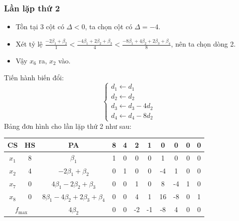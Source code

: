 \documentclass[12pt]{article}
\begin{document}
\subsubsection{Lần lặp thứ 2}
\begin{itemize}
\item Tồn tại 3 cột có $\Delta < 0$, ta chọn cột có $\Delta = -4$.
\item Xét tỷ lệ $\displaystyle \frac{-2\beta_1 + \beta_2}{1} < \frac{-4\beta_1 + 2\beta_2 + \beta_3}{4} < \frac{-8\beta_1 + 4\beta_2 + 2\beta_3 + \beta_4}{8}$, nên ta chọn dòng 2.
\item Vậy $x_6$ ra, $x_2$ vào.
\end{itemize}
Tiến hành biến đổi:
$$
\left\{
\begin{array}{lll}
d_1 \leftarrow d_1 \\
d_2 \leftarrow d_2 \\
d_3 \leftarrow d_3 - 4d_2 \\
d_4 \leftarrow d_4 - 8d_2
\end{array}
\right.
$$
Bảng đơn hình cho lần lặp thứ 2 như sau:
\begin{table}[H]
\centering
\begin{tabular}{|c|c|c|c|c|c|c|c|c|c|c|}
\hline
CS & HS & PA & 8 & 4 & 2 & 1 & 0 & 0 & 0 & 0 \\
\hline
$x_1$ & 8 & $\beta_1$ & 1 & 0 & 0 & 0 & 1 & 0 & 0 & 0 \\
$x_2$ & 4 & $-2\beta_1 + \beta_2$ & 0 & 1 & 0 & 0 & -4 & 1 & 0 & 0 \\
$x_7$ & 0 & $4\beta_1 - 2\beta_2 + \beta_3$ & 0 & 0 & 1 & 0 & 8 & -4 & 1 & 0 \\
$x_8$ & 0 & $8\beta_1 - 4\beta_2 + 2\beta_3 + \beta_4$ & 0 & 0 & 4 & 1 & 16 & -8 & 0 & 1 \\
\hline
\multicolumn{2}{|c|}{$f_{\max}$}
& $4\beta_2$ & 0 & 0 & -2 & -1 & -8 & 4 & 0 & 0 \\
\hline
\end{tabular}
\end{table}
\end{document}
